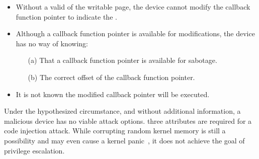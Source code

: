 \begin{itemize}
    \item Without a valid \kva{} of the writable page, the device cannot modify the callback function pointer to indicate the \mabaf.
    \item Although a callback function pointer is available for modifications, the device has no way of knowing: 
    \begin{enumerate}
        \item[(a)] That a callback function pointer is available for sabotage.
        \item[(b)] The correct offset of the callback function pointer.
    \end{enumerate}
    \item It is not known \DIFdelbegin {}\DIFdelend \DIFaddbegin {}\DIFaddend the modified callback pointer will be executed.
\end{itemize}

Under the hypothesized circumstance, and without additional information, a malicious device has no viable attack options.
\DIFdelbegin {}\DIFdelend \DIFaddbegin {}\DIFaddend three attributes are required for a code injection attack.
While corrupting \DIFaddbegin {}\DIFaddend random kernel memory is still a possibility and may even cause a kernel panic~\cite{MMT16}, it does not achieve the goal of privilege escalation.
